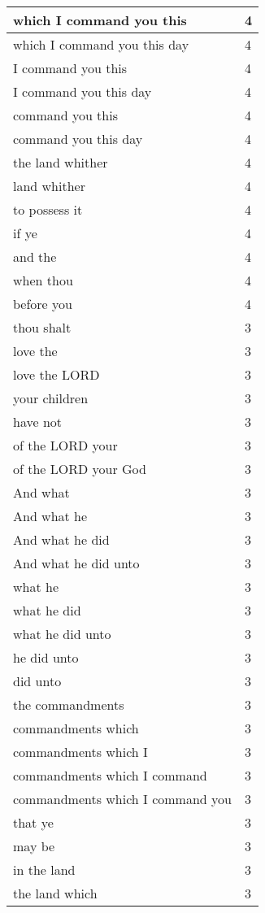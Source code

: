 \begin{center}
\begin{longtable}{|p{3.0in}|p{0.5in}|}
which I command you this & 4\\ \hline 
which I command you this day & 4\\ \hline 
I command you this & 4\\ \hline 
I command you this day & 4\\ \hline 
command you this & 4\\ \hline 
command you this day & 4\\ \hline 
the land whither & 4\\ \hline 
land whither & 4\\ \hline 
to possess it & 4\\ \hline 
if ye & 4\\ \hline 
and the & 4\\ \hline 
when thou & 4\\ \hline 
before you & 4\\ \hline 
thou shalt & 3\\ \hline 
love the & 3\\ \hline 
love the LORD & 3\\ \hline 
your children & 3\\ \hline 
have not & 3\\ \hline 
of the LORD your & 3\\ \hline 
of the LORD your God & 3\\ \hline 
And what & 3\\ \hline 
And what he & 3\\ \hline 
And what he did & 3\\ \hline 
And what he did unto & 3\\ \hline 
what he & 3\\ \hline 
what he did & 3\\ \hline 
what he did unto & 3\\ \hline 
he did unto & 3\\ \hline 
did unto & 3\\ \hline 
the commandments & 3\\ \hline 
commandments which & 3\\ \hline 
commandments which I & 3\\ \hline 
commandments which I command & 3\\ \hline 
commandments which I command you & 3\\ \hline 
that ye & 3\\ \hline 
may be & 3\\ \hline 
in the land & 3\\ \hline 
the land which & 3\\ \hline 

\end{longtable}
\end{center}
